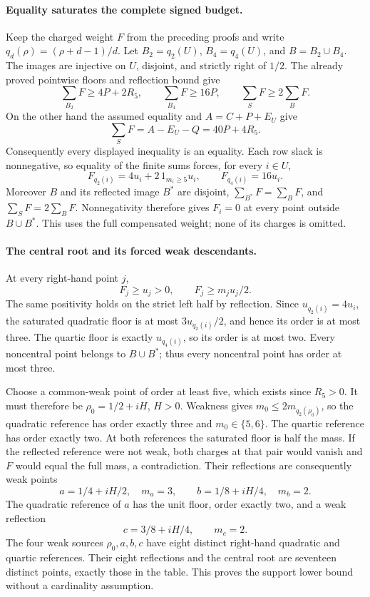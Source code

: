 \paragraph{Equality saturates the complete signed budget.}
Keep the charged weight \(F\) from the preceding proofs and write
\(q_d(\rho)=(\rho+d-1)/d\). Let \(B_2=q_2(U)\),
\(B_4=q_4(U)\), and \(B=B_2\cup B_4\). The images are injective
on \(U\), disjoint, and strictly right of \(1/2\). The already proved
pointwise floors and reflection bound give
\[
 \sum_{B_2}F\ge4P+2R_5,\qquad
 \sum_{B_4}F\ge16P,\qquad
 \sum_S F\ge2\sum_B F.
\]
On the other hand the assumed equality and
\(A=C+P+E_U\) give
\[
 \sum_S F=A-E_U-Q=40P+4R_5.
\]
Consequently every displayed inequality is an equality. Each row slack
is nonnegative, so equality of the finite sums forces, for every
\(i\in U\),
\[
 F_{q_2(i)}=4u_i+2\,1_{m_i\ge5}u_i,\qquad
 F_{q_4(i)}=16u_i.
\]
Moreover \(B\) and its reflected image \(B^*\) are disjoint,
\(\sum_{B^*}F=\sum_BF\), and
\(\sum_SF=2\sum_BF\). Nonnegativity therefore gives
\(F_i=0\) at every point outside \(B\cup B^*\).
This uses the full compensated weight; none of its charges is omitted.

\paragraph{The central root and its forced weak descendants.}
At every right-hand point \(j\),
\[
 F_j\ge u_j>0,\qquad F_j\ge m_j u_j/2.
\]
The same positivity holds on the strict left half by reflection.
Since \(u_{q_2(i)}=4u_i\), the saturated quadratic floor is at most
\(3u_{q_2(i)}/2\), and hence its order is at most three.
The quartic floor is exactly \(u_{q_4(i)}\), so its order is at most
two. Every noncentral point belongs to \(B\cup B^*\); thus every
noncentral point has order at most three.

Choose a common-weak point of order at least five, which exists since
\(R_5>0\). It must therefore be
\(\rho_0=1/2+iH\), \(H>0\). Weakness gives
\(m_0\le2m_{q_2(\rho_0)}\), so the quadratic reference has order
exactly three and \(m_0\in\{5,6\}\). The quartic reference has order
exactly two. At both references the saturated floor is half the mass.
If the reflected reference were not weak, both charges at that pair
would vanish and \(F\) would equal the full mass, a contradiction.
Their reflections are consequently weak points
\[
 a=1/4+iH/2,\quad m_a=3,\qquad
 b=1/8+iH/4,\quad m_b=2.
\]
The quadratic reference of \(a\) has the unit floor, order exactly
two, and a weak reflection
\[
 c=3/8+iH/4,\qquad m_c=2.
\]
The four weak sources \(\rho_0,a,b,c\) have eight distinct right-hand
quadratic and quartic references. Their eight reflections and the
central root are seventeen distinct points, exactly those in the table.
This proves the support lower bound without a cardinality assumption.

